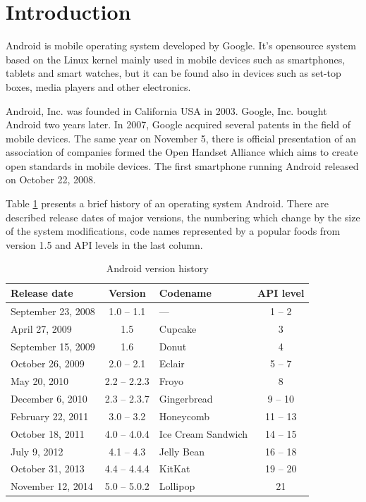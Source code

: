 \section{Introduction}
Android is mobile operating system developed by Google. It's opensource system based on the Linux kernel mainly used in mobile devices such as smartphones, tablets and smart watches, but it can be found also in devices such as set-top boxes, media players and other electronics.

Android, Inc. was founded in California USA in 2003. Google, Inc. bought Android two years later. In 2007, Google acquired several patents in the field of mobile devices. The same year on November 5, there is official presentation of an association of companies formed the Open Handset Alliance which aims to create open standards in mobile devices. The first smartphone running Android released on October 22, 2008.

Table \ref{androidHistory} presents a brief history of an operating system Android. There are described release dates of major versions, the numbering which change by the size of the system modifications, code names represented by a popular foods from version 1.5 and API levels in the last column.

\begin {table}[h!]
    \begin{tabular}{|l|c|l|c|}
    \hline
    {\bf Release date}  & {\bf Version} & {\bf Codename}        & {\bf API level}   \\
    \hline \hline
    September 23, 2008  & 1.0 -- 1.1    & ---                   & 1 -- 2            \\
    \hline
    April 27, 2009      & 1.5           & Cupcake               & 3                 \\
    \hline
    September 15, 2009  & 1.6           & Donut                 & 4                 \\
    \hline
    October 26, 2009    & 2.0 -- 2.1    & Eclair                & 5 -- 7            \\
    \hline
    May 20, 2010        & 2.2 -- 2.2.3  & Froyo                 & 8                 \\
    \hline
    December 6, 2010    & 2.3 -- 2.3.7  & Gingerbread           & 9 -- 10           \\
    \hline
    February 22, 2011   & 3.0 -- 3.2    & Honeycomb             & 11 -- 13          \\
    \hline
    October 18, 2011    & 4.0 -- 4.0.4  & Ice Cream Sandwich    & 14 -- 15          \\
    \hline
    July 9, 2012        & 4.1 -- 4.3    & Jelly Bean            & 16 -- 18          \\
    \hline
    October 31, 2013    & 4.4 -- 4.4.4  & KitKat                & 19 -- 20          \\
    \hline
    November 12, 2014   & 5.0 -- 5.0.2  & Lollipop              & 21                \\
    \hline
    \end{tabular}
    \centering
    \caption{Android version history}
    \label{androidHistory}
\end{table}

